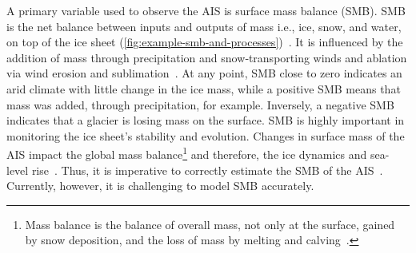 \documentclass[a4paper,11pt,oneside]{report}
\begin{document}
    
    A primary variable used to observe the AIS is surface mass balance (SMB). SMB is the net balance between inputs and outputs of mass i.e., ice, snow, and water, on top of the ice sheet (\autoref{fig:example-smb-and-processes})~\cite{Lenaerts2019}. It is influenced by the addition of mass through precipitation and snow‐transporting winds and ablation via wind erosion and sublimation~\cite{Kittel}. At any point, SMB close to zero indicates an arid climate with little change in the ice mass, while a positive SMB means that mass was added, through precipitation, for example. Inversely, a negative SMB indicates that a glacier is losing mass on the surface. SMB is highly important in monitoring the ice sheet's stability and evolution. Changes in surface mass of the AIS impact the global mass balance\footnote{Mass balance is the balance of overall mass, not only at the surface, gained by snow deposition, and the loss of mass by melting and calving~\cite{icesheet}.} and therefore, the ice dynamics and sea-level rise~\cite{Mottram}. Thus, it is imperative to correctly estimate the SMB of the AIS~\cite{icesheet}. Currently, however, it is challenging to model SMB accurately.  
\end{document}
